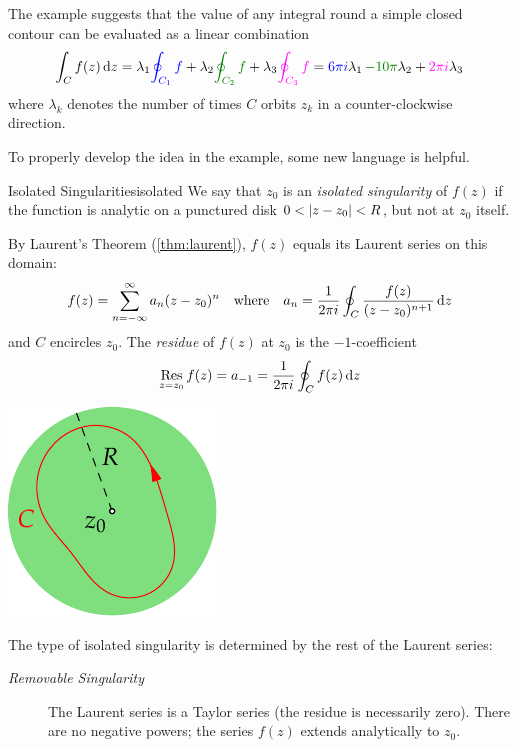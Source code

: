 The example suggests that the value of any integral round a simple closed contour can be evaluated as a linear combination
\[
	\int_C f(z)\,\dz
	=\lambda_1\textcolor{blue}{\oint_{C_1}f}
	+\lambda_2\textcolor{Green}{\oint_{C_2}f}
	+\lambda_3\textcolor{Magenta}{\oint_{C_3}f}
	=\textcolor{blue}{6\pi i}\lambda_1
	\,\textcolor{Green}{-10\pi}\lambda_2
	+\textcolor{Magenta}{2\pi i}\lambda_3
\]
where $\lambda_k$ denotes the number of times $C$ orbits $z_k$ in a counter-clockwise direction.\goodbreak


To properly develop the idea in the example, some new language is helpful.

\begin{defn}{Isolated Singularities}{isolated}
	We say that $z_0$ is an \emph{isolated singularity} of $f(z)$ if the function is analytic on a punctured disk $0<\left| z-z_0\right|<R$, but not at $z_0$ itself.\par
	\begin{minipage}[t]{0.75\linewidth}\vspace{-2pt}
		By Laurent's Theorem (\ref{thm:laurent}), $f(z)$ equals its Laurent series on this domain:
		\[
			f(z)=\sum_{n=-\infty}^\infty a_n(z-z_0)^n
			\quad \text{where}\quad 
			a_n=\frac 1{2\pi i}\oint_C\frac{f(z)}{(z-z_0)^{n+1}}\,{\mathrm{d} z}
		\]
		and $C$ encircles $z_0$. The \emph{residue} of $f(z)$ at $z_0$ is the $-1$-coefficient
		\[
			\operatorname*{Res}_{z=z_0}f(z)=a_{-1}=\frac 1{2\pi i}\oint_C f(z)\,{\mathrm{d} z}
		\]
	\end{minipage}
	\hfill
	\begin{minipage}[t]{0.24\linewidth}\vspace{-15pt}
		\flushright\includegraphics[scale=0.95]{isolatedsing}
	\end{minipage}\bigbreak
	The type of isolated singularity is determined by the rest of the Laurent series:
	\begin{description}
		\item[\normalfont\emph{Removable Singularity}] The Laurent series is a Taylor series (the residue is necessarily zero). There are no negative powers; the series $f(z)$ extends analytically to $z_0$. 

\end{description}
\end{defn}
